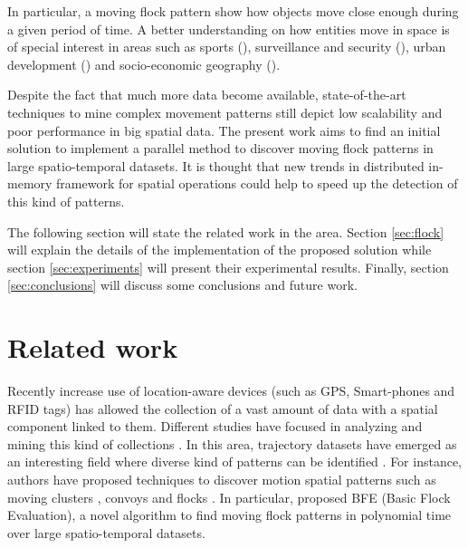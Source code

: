 \documentclass[12pt]{scrartcl}
\begin{document}
In particular, a moving flock pattern show how objects move close enough during a given period of time.  A better understanding on how entities move in space is of special interest in areas such as sports (\cite{iwase_tracking_2002}),  surveillance and security (\cite{makris_path_2002,piciarelli_trajectory_2005}), urban development (\cite{huang_trajgraph:_2016, long_combining_2015}) and socio-economic geography (\cite{frank_life_2000}).

Despite the fact that much more data become available, state-of-the-art techniques to mine complex movement patterns still depict low scalability and poor performance in big spatial data.  The present work aims to find an initial solution to implement a parallel method to discover moving flock patterns in large spatio-temporal datasets.  It is thought that new trends in distributed in-memory framework for spatial operations could help to speed up the detection of this kind of patterns.

The following section will state the related work in the area.  Section \ref{sec:flock} will explain the details of the implementation of the proposed solution while section \ref{sec:experiments} will present their experimental results. Finally, section \ref{sec:conclusions} will discuss some conclusions and future work. 

\section{Related work}
% 

Recently increase use of location-aware devices (such as GPS, Smart-phones and RFID tags) has allowed the collection of a vast amount of data with a spatial component linked to them.  Different studies have focused in analyzing and mining this kind of collections \citep{leung_knowledge_2010, miller_geographic_2001}.  In this area, trajectory datasets have emerged as an interesting field where diverse kind of patterns can be identified \citep{zheng_computing_2011, vieira_spatio-temporal_2013}.  For instance, authors have proposed techniques to discover motion spatial patterns such as moving clusters \citep{kalnis_discovering_2005}, convoys \citep{jeung_discovery_2008} and flocks \citep{benkert_reporting_2008, gudmundsson_computing_2006}.  In particular, \cite{vieira_-line_2009} proposed BFE (Basic Flock Evaluation), a novel algorithm to find moving flock patterns in polynomial time over large spatio-temporal datasets.  
 
\end{document}
